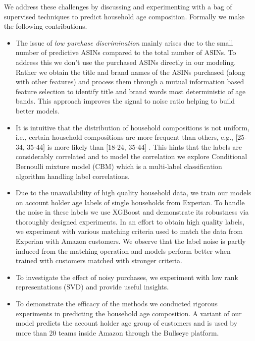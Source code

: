 We address these challenges by discussing and experimenting with a bag of supervised techniques to predict household age composition. Formally we make the following contributions.
\begin{itemize}
\item The issue of \textit{low purchase discrimination} mainly arises due to the small number of predictive ASINs compared to the total number of ASINs. To address this we don't use the purchased ASINs directly in our modeling. Rather we obtain the title and brand names of the ASINs purchased (along with other features) and process them through a mutual information based feature selection to identify title and brand words most deterministic of age bands. This approach improves the signal to noise ratio helping to build better models.
\item It is intuitive that the distribution of household compositions is not uniform, i.e., certain household compositions are more frequent than others, e.g., [25-34, 35-44] is more likely than [18-24, 35-44] . This hints that the labels are considerably correlated and to model the correlation we explore Conditional Bernoulli mixture model (CBM) \cite{li2016conditional} which is a multi-label classification algorithm handling label correlations.
%
\item Due to the unavailability of high quality household data, we train our models on account holder age labels of single households from Experian. To handle the noise in these labels we use XGBoost and demonstrate its robustness via thoroughly designed experiments. In an effort to obtain high quality labels, we experiment with various matching criteria used to match the data from Experian with Amazon customers. We observe that the label noise is partly induced from the matching operation and models perform better when trained with customers matched with stronger criteria.
%
\item To investigate the effect of noisy purchases, we experiment with low rank representations (SVD) and provide useful insights. 
\item To demonstrate the efficacy of the methods we conducted rigorous experiments in predicting the household age composition. A variant of our model predicts the account holder age group of customers and is used by more than 20 teams inside Amazon through the Bullseye platform.
\end{itemize}


